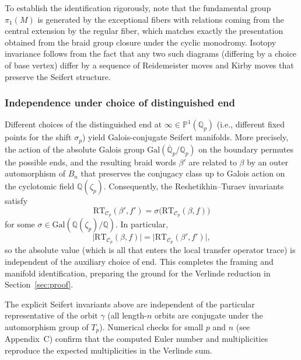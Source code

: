 To establish the identification rigorously, note that the fundamental group \(\pi_1(M)\) is generated by the exceptional fibers with relations coming from the central extension by the regular fiber, which matches exactly the presentation obtained from the braid group closure under the cyclic monodromy. Isotopy invariance follows from the fact that any two such diagrams (differing by a choice of base vertex) differ by a sequence of Reidemeister moves and Kirby moves that preserve the Seifert structure.

\subsubsection{Independence under choice of distinguished end}

Different choices of the distinguished end at \(\infty \in \mathbb{P}^1(\mathbb{Q}_p)\) (i.e., different fixed points for the shift \(\sigma_p\)) yield Galois-conjugate Seifert manifolds. More precisely, the action of the absolute Galois group \(\mathrm{Gal}(\overline{\mathbb{Q}}_p / \mathbb{Q}_p)\) on the boundary permutes the possible ends, and the resulting braid words \(\beta'\) are related to \(\beta\) by an outer automorphism of \(B_n\) that preserves the conjugacy class up to Galois action on the cyclotomic field \(\mathbb{Q}(\zeta_p)\). Consequently, the Reshetikhin--Turaev invariants satisfy
\[
\mathrm{RT}_{\mathcal{C}_p}(\beta', f') = \sigma\bigl( \mathrm{RT}_{\mathcal{C}_p}(\beta, f) \bigr)
\]
for some \(\sigma \in \mathrm{Gal}(\mathbb{Q}(\zeta_p)/\mathbb{Q})\). In particular,
\[
\bigl| \mathrm{RT}_{\mathcal{C}_p}(\beta, f) \bigr| = \bigl| \mathrm{RT}_{\mathcal{C}_p}(\beta', f') \bigr|,
\]
so the absolute value (which is all that enters the local transfer operator trace) is independent of the auxiliary choice of end. This completes the framing and manifold identification, preparing the ground for the Verlinde reduction in Section~\ref{sec:proof}.

\begin{remark}
The explicit Seifert invariants above are independent of the particular representative of the orbit \(\gamma\) (all length-\(n\) orbits are conjugate under the automorphism group of \(T_p\)). Numerical checks for small \(p\) and \(n\) (see Appendix~C) confirm that the computed Euler number and multiplicities reproduce the expected multiplicities in the Verlinde sum.
\end{remark}